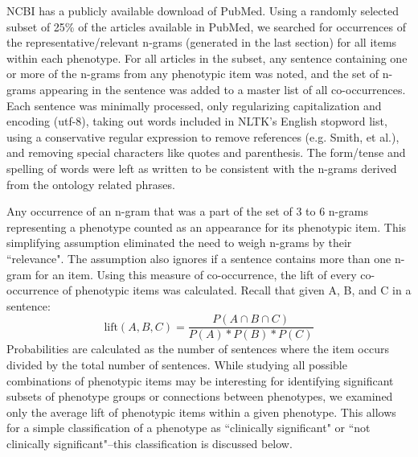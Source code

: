 \documentclass{sig-alternate-05-2015}
\newcommand{\kibitz}[2]{\ifnum\Comments=1\textcolor{#1}{#2}\fi}
\newcommand{\joyce}[1]{\kibitz{purple}      {[Joyce: #1]}}
\newcommand{\jette}[1]{\kibitz{red}      {[Jette: #1]}}
\begin{document}
NCBI has a publicly available download of PubMed.
Using a randomly selected subset of 25\% of the articles available in PubMed, we searched for occurrences of the representative/relevant n-grams (generated in the last section) for all items within each phenotype.
For all articles in the subset, any sentence containing one or more of the n-grams from any phenotypic item was noted, and the set of n-grams appearing in the sentence was added to a master list of all co-occurrences. 
Each sentence was minimally processed, only regularizing capitalization and encoding (utf-8), taking out words included in NLTK's English stopword list, using a conservative regular expression to remove references (e.g. Smith, et al.), and removing special characters like quotes and parenthesis. %
The form/tense and spelling of words were left as written to be consistent with the n-grams derived from the ontology related phrases.

Any occurrence of an n-gram that was a part of the set of 3 to 6 n-grams representing a phenotype counted as an appearance for its phenotypic item.
This simplifying assumption eliminated the need to weigh n-grams by their ``relevance".
The assumption also ignores if a sentence contains more than one n-gram for an item.
Using this measure of co-occurrence, the lift of every co-occurrence of phenotypic items was calculated. Recall that given A, B, and C in a sentence:
$$ \text{lift}(A,B,C) = \frac {P(A \cap B \cap C)} {P(A)*P(B)*P(C)}  $$
Probabilities are calculated as the number of sentences where the item occurs divided by the total number of sentences.
While studying all possible combinations of phenotypic items may be interesting for identifying significant subsets of phenotype groups or connections between phenotypes, we examined only the average lift of phenotypic items within a given phenotype.
This allows for a simple classification of a phenotype as ``clinically significant" or ``not clinically significant"--this classification is discussed below.%
\end{document}
